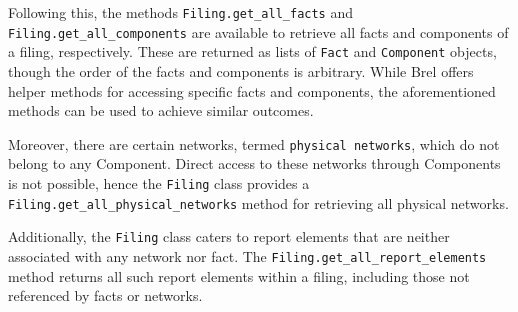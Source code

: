 Following this, the methods \texttt{Filing.get\_all\_facts} and \texttt{Filing.get\_all\_components} are available to retrieve all facts and components of a filing, respectively.
These are returned as lists of \texttt{Fact} and \texttt{Component} objects, though the order of the facts and components is arbitrary.
While Brel offers helper methods for accessing specific facts and components, the aforementioned methods can be used to achieve similar outcomes.

Moreover, there are certain networks, termed \texttt{physical networks}, which do not belong to any Component.
Direct access to these networks through Components is not possible, 
hence the \texttt{Filing} class provides a \texttt{Filing.get\_all\_physical\_networks} method for retrieving all physical networks.

Additionally, the \texttt{Filing} class caters to report elements that are neither associated with any network nor fact.
The \texttt{Filing.get\_all\_report\_elements} method returns all such report elements within a filing, 
including those not referenced by facts or networks.

